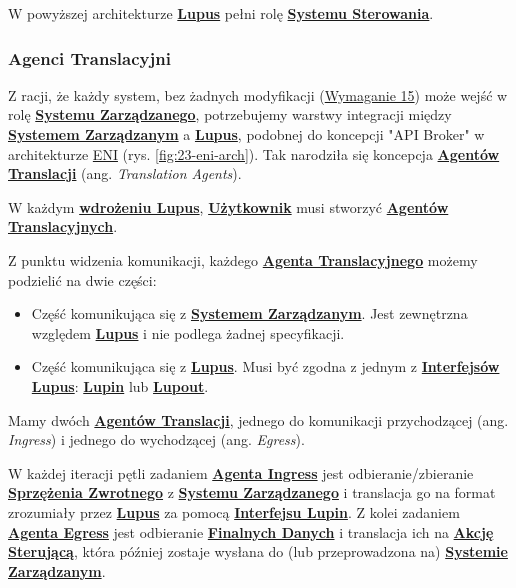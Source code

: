 W powyższej architekturze \hyperlink{def:lupus}{\textbf{Lupus}} pełni rolę \hyperlink{def:system-sterowania}{\textbf{Systemu Sterowania}}.


\subsubsection{Agenci Translacyjni}
Z racji, że każdy system, bez żadnych modyfikacji (\hyperref[req:15]{Wymaganie 15}) może wejść w rolę \hyperlink{def:system-zarzadzany}{\textbf{Systemu Zarządzanego}}, potrzebujemy warstwy integracji między \hyperlink{def:system-zarzadzany}{\textbf{Systemem Zarządzanym}} a \hyperlink{def:lupus}{\textbf{Lupus}}, podobnej do koncepcji "API Broker" w architekturze \hyperlink{def:eni}{ENI} (rys. \ref{fig:23-eni-arch}). Tak narodziła się koncepcja \hyperlink{def:agent-translacji}{\textbf{Agentów Translacji}} (ang. \textit{Translation Agents}). 

W każdym \hyperlink{def:wdrozenie-lupus}{\textbf{wdrożeniu Lupus}}, \hyperlink{def:uzytkownik}{\textbf{Użytkownik}} musi stworzyć \hyperlink{def:agent-translacji}{\textbf{Agentów Translacyjnych}}. 

Z punktu widzenia komunikacji, każdego \hyperlink{def:agent-translacji}{\textbf{Agenta Translacyjnego}} możemy podzielić na dwie części:
\begin{itemize}
    \item Część komunikująca się z \hyperlink{def:system-zarzadzany}{\textbf{Systemem Zarządzanym}}. Jest zewnętrzna względem \hyperlink{def:lupus}{\textbf{Lupus}} i nie podlega żadnej specyfikacji.
    \item Część komunikująca się z \hyperlink{def:lupus}{\textbf{Lupus}}. Musi być zgodna z jednym z \hyperlink{def:interfejsy-lupus}{\textbf{Interfejsów Lupus}}: \hyperlink{def:interfejs-lupin}{\textbf{Lupin}} lub \hyperlink{def:interfejs-lupout}{\textbf{Lupout}}.
\end{itemize}

Mamy dwóch \hyperlink{def:agent-translacji}{\textbf{Agentów Translacji}}, jednego do komunikacji przychodzącej (ang. \textit{Ingress}) i jednego do wychodzącej (ang. \textit{Egress}). 

W każdej iteracji pętli zadaniem \hyperlink{def:agent-ingress}{\textbf{Agenta Ingress}} jest odbieranie/zbieranie \hyperlink{def:sprzezenie-zwrotne}{\textbf{Sprzężenia Zwrotnego}} z \hyperlink{def:system-zarzadzany}{\textbf{Systemu Zarządzanego}} i translacja go na format zrozumiały przez \hyperlink{def:lupus}{\textbf{Lupus}} za pomocą \hyperlink{def:interfejs-lupin}{\textbf{Interfejsu Lupin}}. Z kolei zadaniem \hyperlink{def:agent-egress}{\textbf{Agenta Egress}} jest odbieranie \hyperlink{def:finalne-dane}{\textbf{Finalnych Danych}} i translacja ich na \hyperlink{def:akcja-sterujaca}{\textbf{Akcję Sterującą}}, która później zostaje wysłana do (lub przeprowadzona na) \hyperlink{def:system-zarzadzany}{\textbf{Systemie Zarządzanym}}.


